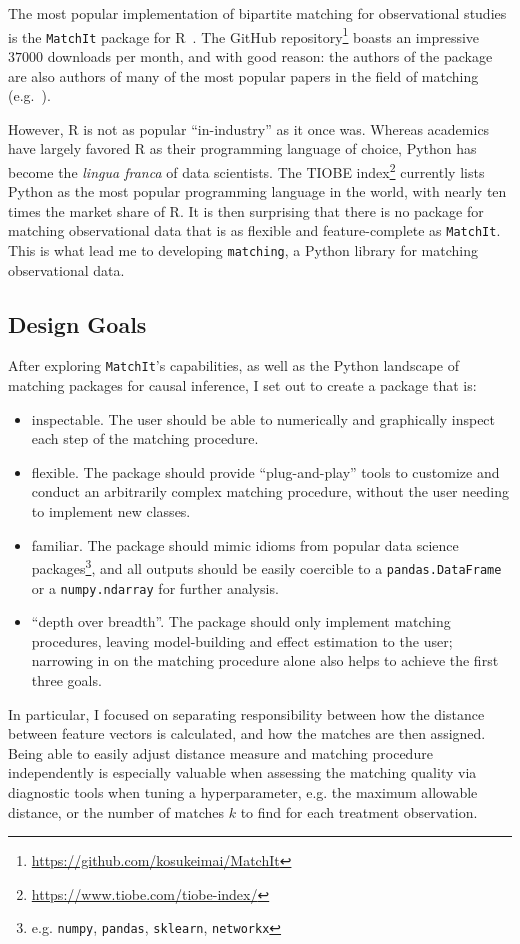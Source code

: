 \documentclass[11pt]{extarticle}
\begin{document}
The most popular implementation of bipartite matching for observational studies is the \texttt{MatchIt} package for R~\parencite{ho_matchit_2011}.
The GitHub repository\footnote{\url{https://github.com/kosukeimai/MatchIt}} boasts an impressive $37000$ downloads per month, and with good reason: the authors of the package are also authors of many of the most popular papers in the field of matching (e.g.~\textcite{ho_matching_2007, imai_causal_2004, king_why_2019, stuart_matching_2010}).

However, R is not as popular ``in-industry'' as it once was. Whereas academics have largely favored R as their programming language of choice, Python has become the \emph{lingua franca} of data scientists. The TIOBE index\footnote{\url{https://www.tiobe.com/tiobe-index/}} currently lists Python as the most popular programming language in the world, with nearly ten times the market share of R.
It is then surprising that there is no package for matching observational data that is as flexible and feature-complete as \texttt{MatchIt}. This is what lead me to developing \texttt{matching}, a Python library for matching observational data.

\subsection{Design Goals}

After exploring \texttt{MatchIt}'s capabilities, as well as the Python landscape of matching packages for causal inference, I set out to create a package that is:
\begin{itemize}
  \item inspectable. The user should be able to numerically and graphically inspect each step of the matching procedure.
  \item flexible. The package should provide ``plug-and-play'' tools to customize and conduct an arbitrarily complex matching procedure, without the user needing to implement new classes.
  \item familiar. The package should mimic idioms from popular data science packages\footnote{e.g. \texttt{numpy}, \texttt{pandas}, \texttt{sklearn}, \texttt{networkx}}, and all outputs should be easily coercible to a \texttt{pandas.DataFrame} or a \texttt{numpy.ndarray} for further analysis.
  \item ``depth over breadth''. The package should only implement matching procedures, leaving model-building and effect estimation to the user; narrowing in on the matching procedure alone also helps to achieve the first three goals.
\end{itemize}
In particular, I focused on separating responsibility between how the distance between feature vectors is calculated, and how the matches are then assigned. Being able to easily adjust distance measure and matching procedure independently is especially valuable when assessing the matching quality via diagnostic tools when tuning a hyperparameter, e.g. the maximum allowable distance, or the number of matches $k$ to find for each treatment observation.
\end{document}
